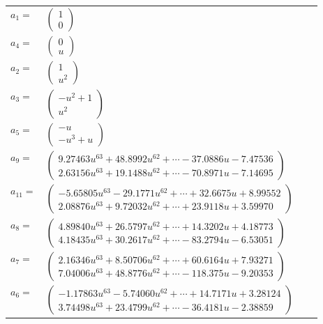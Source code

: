 \documentclass[1p]{elsarticle_modified}
\theoremstyle{definition}
\begin{document}
\begin{tabular}{m{7pt} m{180pt} m{7pt} m{180pt} }
\flushright $a_{1}=$&$\begin{pmatrix}1\\0\end{pmatrix}$ \\
\flushright $a_{4}=$&$\begin{pmatrix}0\\u\end{pmatrix}$ \\
\flushright $a_{2}=$&$\begin{pmatrix}1\\u^2\end{pmatrix}$ \\
\flushright $a_{3}=$&$\begin{pmatrix}- u^2+1\\u^2\end{pmatrix}$ \\
\flushright $a_{5}=$&$\begin{pmatrix}- u\\- u^3+u\end{pmatrix}$ \\
\flushright $a_{9}=$&$\begin{pmatrix}9.27463 u^{63}+48.8992 u^{62}+\cdots-37.0886 u-7.47536\\2.63156 u^{63}+19.1488 u^{62}+\cdots-70.8971 u-7.14695\end{pmatrix}$ \\
\flushright $a_{11}=$&$\begin{pmatrix}-5.65805 u^{63}-29.1771 u^{62}+\cdots+32.6675 u+8.99552\\2.08876 u^{63}+9.72032 u^{62}+\cdots+23.9118 u+3.59970\end{pmatrix}$ \\
\flushright $a_{8}=$&$\begin{pmatrix}4.89840 u^{63}+26.5797 u^{62}+\cdots+14.3202 u+4.18773\\4.18435 u^{63}+30.2617 u^{62}+\cdots-83.2794 u-6.53051\end{pmatrix}$ \\
\flushright $a_{7}=$&$\begin{pmatrix}2.16346 u^{63}+8.50706 u^{62}+\cdots+60.6164 u+7.93271\\7.04006 u^{63}+48.8776 u^{62}+\cdots-118.375 u-9.20353\end{pmatrix}$ \\
\flushright $a_{6}=$&$\begin{pmatrix}-1.17863 u^{63}-5.74060 u^{62}+\cdots+14.7171 u+3.28124\\3.74498 u^{63}+23.4799 u^{62}+\cdots-36.4181 u-2.38859\end{pmatrix}$ \\

\end{tabular}
\end{document}
